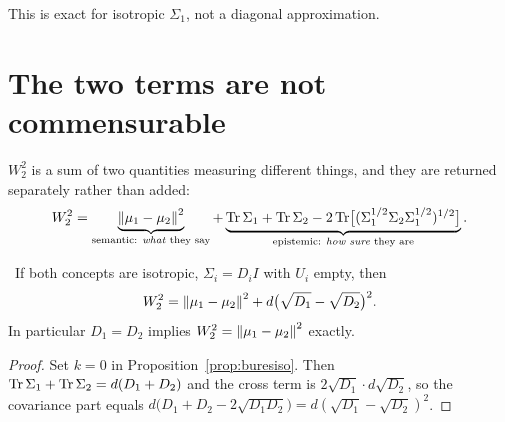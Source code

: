 This is exact for isotropic $\Sigma_1$, not a diagonal approximation.

\section{The two terms are not commensurable}

\begin{construction}\label{con:w2split}
$W_2^2$ is a sum of two quantities measuring different things, and they
are returned separately rather than added:
\begin{equation}\label{eq:w2split}
  W_2^2=
  \underbrace{\left\lVert \mu_1-\mu_2 \right\rVert^2}_{\text{semantic: \emph{what} they say}}
  +
  \underbrace{\operatorname{Tr}\Sigma_1+\operatorname{Tr}\Sigma_2
   -2\operatorname{Tr}\bigl[(\Sigma_1^{1/2}\Sigma_2\Sigma_1^{1/2})^{1/2}\bigr]}
   _{\text{epistemic: \emph{how sure} they are}} .
\end{equation}
\end{construction}

\begin{proposition}\label{prop:w2hazard}
\Proved\ If both concepts are isotropic, $\Sigma_i=D_iI$ with $U_i$
empty, then
\begin{equation}\label{eq:w2iso}
  W_2^2=\left\lVert \mu_1-\mu_2 \right\rVert^2+d\bigl(\sqrt{D_1}-\sqrt{D_2}\bigr)^2 .
\end{equation}
In particular $D_1=D_2$ implies $W_2^2=\left\lVert \mu_1-\mu_2 \right\rVert^2$ exactly.
\end{proposition}
\begin{proof}
Set $k=0$ in Proposition~\ref{prop:buresiso}. Then
$\operatorname{Tr}\Sigma_1+\operatorname{Tr}\Sigma_2=d(D_1+D_2)$ and the cross term is
$2\sqrt{D_1}\cdot d\sqrt{D_2}$, so the covariance part equals
$d\bigl(D_1+D_2-2\sqrt{D_1D_2}\bigr)=d(\sqrt{D_1}-\sqrt{D_2})^2$.
\end{proof}

